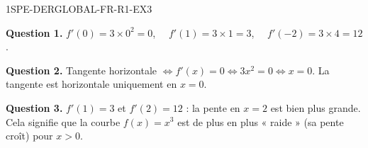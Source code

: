 \begin{corrige}{1SPE-DERGLOBAL-FR-R1-EX3}

\textbf{Question 1.}
$f'(0) = 3 \times 0^2 = 0$, $\quad f'(1) = 3 \times 1 = 3$, $\quad f'(-2) = 3 \times 4 = 12$.

\textbf{Question 2.}
Tangente horizontale $\Leftrightarrow f'(x) = 0 \Leftrightarrow 3x^2 = 0 \Leftrightarrow x = 0$.
La tangente est horizontale uniquement en $x = 0$.

\textbf{Question 3.}
$f'(1) = 3$ et $f'(2) = 12$ : la pente en $x = 2$ est bien plus grande. Cela signifie que la courbe $f(x) = x^3$ est de plus en plus « raide » (sa pente croît) pour $x > 0$.

\end{corrige}
